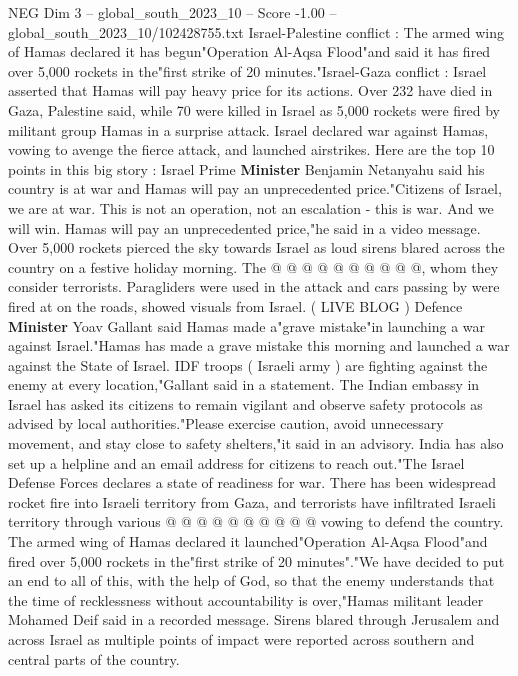 \begin{textsample}{NEG Dim 3 – global\_south\_2023\_10 – Score -1.00 – global\_south\_2023\_10/102428755.txt}  \label{ex:f3_neg_023}
Israel-Palestine conflict : The armed wing of Hamas declared it has begun"Operation Al-Aqsa Flood"and said it has fired over 5,000 rockets in the"first strike of 20 minutes."Israel-Gaza conflict : Israel asserted that Hamas will pay heavy price for its actions.
Over 232 have died in Gaza, Palestine said, while 70 were killed in Israel as 5,000 rockets were fired by militant group Hamas in a surprise attack.
Israel declared war against Hamas, vowing to avenge the fierce attack, and launched airstrikes.
Here are the top 10 points in this big story : Israel Prime \textbf{Minister} Benjamin Netanyahu said his country is at war and Hamas will pay an unprecedented price."Citizens of Israel, we are at war.
This is not an operation, not an escalation - this is war.
And we will win.
Hamas will pay an unprecedented price,"he said in a video message.
Over 5,000 rockets pierced the sky towards Israel as loud sirens blared across the country on a festive holiday morning.
The @ @ @ @ @ @ @ @ @ @, whom they consider terrorists.
Paragliders were used in the attack and cars passing by were fired at on the roads, showed visuals from Israel. ( LIVE BLOG ) Defence \textbf{Minister} Yoav Gallant said Hamas made a"grave mistake"in launching a war against Israel."Hamas has made a grave mistake this morning and launched a war against the State of Israel.
IDF troops ( Israeli army ) are fighting against the enemy at every location,"Gallant said in a statement.
The Indian embassy in Israel has asked its citizens to remain vigilant and observe safety protocols as advised by local authorities."Please exercise caution, avoid unnecessary movement, and stay close to safety shelters,"it said in an advisory.
India has also set up a helpline and an email address for citizens to reach out."The Israel Defense Forces declares a state of readiness for war.
There has been widespread rocket fire into Israeli territory from Gaza, and terrorists have infiltrated Israeli territory through various @ @ @ @ @ @ @ @ @ @ vowing to defend the country.
The armed wing of Hamas declared it launched"Operation Al-Aqsa Flood"and fired over 5,000 rockets in the"first strike of 20 minutes"."We have decided to put an end to all of this, with the help of God, so that the enemy understands that the time of recklessness without accountability is over,"Hamas militant leader Mohamed Deif said in a recorded message.
Sirens blared through Jerusalem and across Israel as multiple points of impact were reported across southern and central parts of the country.

\end{textsample}
